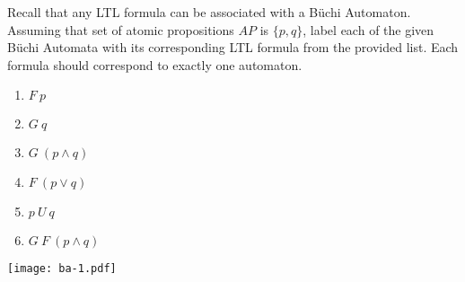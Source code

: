 \documentclass[12pt]{article}
\newenvironment{problem}[2][Problem]{\begin{trivlist}
\item[\hskip \labelsep {\bfseries #1}\hskip \labelsep {\bfseries #2.}]}{\end{trivlist}}
\begin{document}
\begin{problem}{B\"uchi Automata for LTL Formulas (25 points)} Recall that any LTL formula can be associated with a B\"uchi Automaton. Assuming that set of atomic propositions $AP$ is $\{p, q \}$, label each of the given B\"uchi Automata with its corresponding LTL formula from the provided list. Each formula should correspond to exactly one automaton. 


\begin{multicols}{3}
\begin{enumerate}[label=\alph*.]

\item $ F \ p $

\item $ G \ q $

\item $ G \ (p \land q) $

\item $ F \ (p \lor q) $

\item $ p \ U \ q $

\item $ G \ F \ (p \land q) $



\end{enumerate}
\end{multicols}

\texttt{[image: ba-1.pdf]}


\end{problem}


\newpage

\newpage
\end{document}

